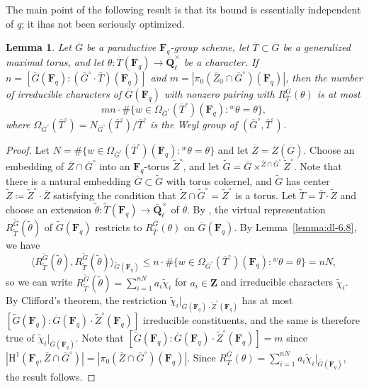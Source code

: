 \documentclass[reqno]{amsart}
\numberwithin{equation}{subsection}
\newcommand{\F}{\mathbf{F}}
\newcommand{\wt}[1]{\widetilde{#1}}
\newcommand{\Q}{\mathbf{Q}}
\newcommand{\Z}{\mathbf{Z}}
\newcommand{\ol}[1]{\overline{#1}}
\newcommand{\co}{\colon}
\newcommand{\rH}{\ensuremath{\mathrm{H}}\xspace}
\newtheorem{lemma}[thm]{Lemma}
\theoremstyle{remark}
\numberwithin{equation}{subsection}
\numberwithin{figure}{subsection}
\begin{document}
The main point of the following result is that its bound is essentially independent of $q$; it ihas not been seriously optimized. 

\begin{lemma}\label{lemma:dl-6.8-variant}
    Let $\ol G$ be a paraductive $\F_q$-group scheme, let $\ol T \subset \ol G$ be a generalized maximal torus, and let $\theta\co \ol T(\F_q) \to \ol\Q_\ell^\times$ be a character. If $n = [\ol G(\F_q)\co (\ol G^\circ \cdot \ol T)(\F_q)]$ and $m = |\pi_0(\ol Z_0 \cap \ol G^\circ)(\F_q)|$, then the number of irreducible characters of $\ol G(\F_q)$ with nonzero pairing with $R_{\ol T}^{\ol G}(\theta)$ is at most 
    \[
    m n \cdot \#\{w \in \Omega_{\ol G^\circ}(\ol T^\circ)(\F_q)\co {}^w\theta = \theta\},
    \]
    where $\Omega_{\ol G^\circ}(\ol T^\circ) = N_{\ol G^\circ}(\ol T^\circ)/\ol T^\circ$ is the Weyl group of $(\ol G^\circ, \ol T^\circ)$.
\end{lemma}

\begin{proof}
    Let $N = \#\{w \in \Omega_{\ol G^\circ}(\ol T^\circ)(\F_q)\co {}^w\theta = \theta\}$ and let $\ol Z = Z(\ol G)$. Choose an embedding of $\ol Z \cap \ol G^\circ$ into an $\F_q$-torus $\wt Z^\circ$, and let $\wt G = \ol G \times^{\ol Z \cap \ol G^\circ} \wt Z^\circ$. Note that there is a natural embedding $\ol G \subset \wt G$ with torus cokernel, and $\wt G$ has center $\wt Z \coloneqq \wt Z^\circ \cdot \ol Z$ satisfying the condition that $\wt Z \cap \wt G^\circ = \wt Z^\circ$ is a torus. Let $\wt T = \ol T \cdot \wt Z$ and choose an extension $\wt\theta\co \wt T(\F_q) \to \ol\Q_\ell^\times$ of $\theta$. By \cite[Remark 2.6.5]{Kal21b}, the virtual representation $R_{\wt T}^{\wt G}(\wt\theta)$ of $\wt G(\F_q)$ restricts to $R_{\ol T}^{\ol G}(\theta)$ on $\ol G(\F_q)$. By Lemma~\ref{lemma:dl-6.8}, we have
    \[
    \langle R_{\wt T}^{\wt G}(\wt\theta), R_{\wt T}^{\wt G}(\wt\theta)\rangle_{\wt G(\F_q)} \leq n \cdot \#\{w \in \Omega_{\ol G^\circ}(\ol T^\circ)(\F_q)\co {}^w\theta = \theta\} = nN,
    \]
    so we can write $R_{\wt T}^{\wt G}(\wt\theta) = \sum_{i=1}^{nN} a_i\wt\chi_i$ for $a_i \in \Z$ and irreducible characters $\wt\chi_i$. By Clifford's theorem, the restriction $\wt\chi_i|_{\ol G(\F_q) \cdot \wt Z^\circ(\F_q)}$ has at most $[\wt G(\F_q)\co \ol G(\F_q) \cdot \wt Z^\circ(\F_q)]$ irreducible constituents, and the same is therefore true of $\wt\chi_i|_{\ol G(\F_q)}$.
    Note that $[\wt G(\F_q)\co \ol G(\F_q) \cdot \wt Z^\circ(\F_q)] = m$ since $|\rH^1(\F_q, \ol Z \cap \ol G^\circ)| = |\pi_0(\ol Z \cap \ol G^\circ)(\F_q)|$. Since $R_{\ol T}^{\ol G}(\theta) = \sum_{i=1}^{nN} a_i\wt\chi_i|_{\ol G(\F_q)}$, the result follows.
\end{proof}
\end{document}
